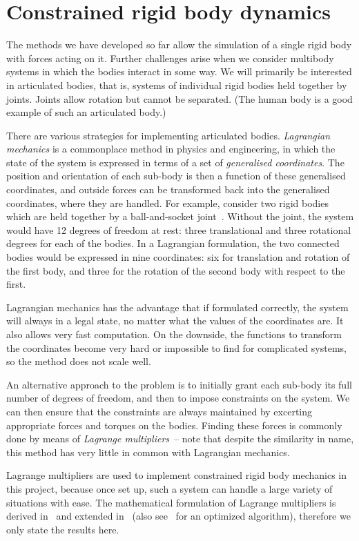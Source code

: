 \section{Constrained rigid body dynamics}
The methods we have developed so far allow the simulation of a single rigid body with forces
acting on it. Further challenges arise when we consider multibody systems in which the bodies
interact in some way. We will primarily be interested in articulated bodies, that is, systems
of individual rigid bodies held together by joints. Joints allow rotation but cannot be
separated. (The human body is a good example of such an articulated body.)

There are various strategies for implementing articulated bodies. {\em Lagrangian mechanics}
is a commonplace method in physics and engineering, in which the state of the system is expressed
in terms of a set of {\em generalised coordinates}. The position and orientation of each sub-body
is then a function of these generalised coordinates, and outside forces can be transformed
back into the generalised coordinates, where they are handled. For example, consider two rigid
bodies which are held together by a ball-and-socket joint~\cite{Kalra:95}. Without the joint,
the system would have 12 degrees of freedom at rest: three translational and three rotational
degrees for each of the bodies. In a Lagrangian formulation, the two connected bodies would be
expressed in nine coordinates: six for translation and rotation of the first body, and three
for the rotation of the second body with respect to the first.

Lagrangian mechanics has the advantage that if formulated correctly, the system will always in a
legal state, no matter what the values of the coordinates are. It also allows very fast
computation. On the downside, the functions to transform the coordinates become very hard or
impossible to find for complicated systems, so the method does not scale well.

An alternative approach to the problem is to initially grant each sub-body its full number of
degrees of freedom, and then to impose constraints on the system. We can then ensure that the
constraints are always maintained by excerting appropriate forces and torques on the bodies.
Finding these forces is commonly done by means of {\em Lagrange multipliers}~-- note that
despite the similarity in name, this method has very little in common with Lagrangian mechanics.

Lagrange multipliers are used to implement constrained rigid body mechanics in this project,
because once set up, such a system can handle a large variety of situations with ease.
The mathematical formulation of Lagrange multipliers is derived in~\cite{BaraffWitkin:97} and
extended in~\cite{Saunders:PhD} (also see~\cite{Baraff:96} for an optimized algorithm),
therefore we only state the results here.

